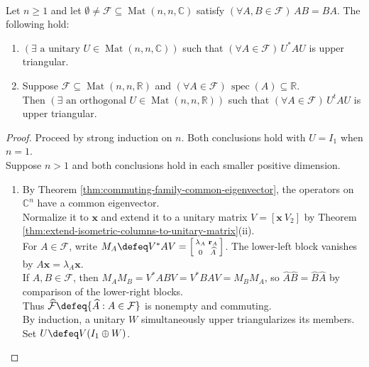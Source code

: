 \begin{theorem} \label{thm:simultaneous-schur-triangularization-commuting-family} \\
Let $n\geq1$ and let $\emptyset\neq\mathcal{F}\subseteq\operatorname{Mat}(n,n,\mathbb{C})$ satisfy $(\forall A,B\in\mathcal{F})\,AB=BA$. The following hold:
\begin{enumerate}[label=(\roman*)]
\setlength{\itemsep}{0pt}
\item $(\exists\text{ a unitary }U\in\operatorname{Mat}(n,n,\mathbb{C}))$ such that $(\forall A\in\mathcal{F})\,U^*AU$ is upper triangular.
\item Suppose $\mathcal{F}\subseteq\operatorname{Mat}(n,n,\mathbb{R})$ and $(\forall A\in\mathcal{F})\,\operatorname{spec}(A)\subseteq\mathbb{R}$.\\
Then $(\exists\text{ an orthogonal }U\in\operatorname{Mat}(n,n,\mathbb{R}))$ such that $(\forall A\in\mathcal{F})\,U^tAU$ is upper triangular.
\end{enumerate}
\begin{proof}
Proceed by strong induction on $n$. Both conclusions hold with $U=I_1$ when $n=1$.\\
Suppose $n>1$ and both conclusions hold in each smaller positive dimension.
\begin{enumerate}[label=(\roman*)]
\setlength{\itemsep}{0pt}
\item By Theorem \ref{thm:commuting-family-common-eigenvector}, the operators on $\mathbb{C}^n$ have a common eigenvector.\\
Normalize it to $\mathbf{x}$ and extend it to a unitary matrix $V=[\mathbf{x}\ V_2]$ by Theorem \ref{thm:extend-isometric-columns-to-unitary-matrix}(ii).\\
For $A\in\mathcal{F}$, write $M_A\defeq V^*AV=\left[\begin{smallmatrix}\lambda_A&\mathbf{r}_A\\0&\widehat A\end{smallmatrix}\right]$. The lower-left block vanishes by $A\mathbf{x}=\lambda_A\mathbf{x}$.\\
If $A,B\in\mathcal{F}$, then $M_AM_B=V^*ABV=V^*BAV=M_BM_A$, so $\widehat A\widehat B=\widehat B\widehat A$ by comparison of the lower-right blocks.\\
Thus $\widehat{\mathcal{F}}\defeq\{\widehat A:A\in\mathcal{F}\}$ is nonempty and commuting.\\
By induction, a unitary $W$ simultaneously upper triangularizes its members. Set $U\defeq V(I_1\oplus W)$.\\

\end{enumerate}
\end{proof}
\end{theorem}
